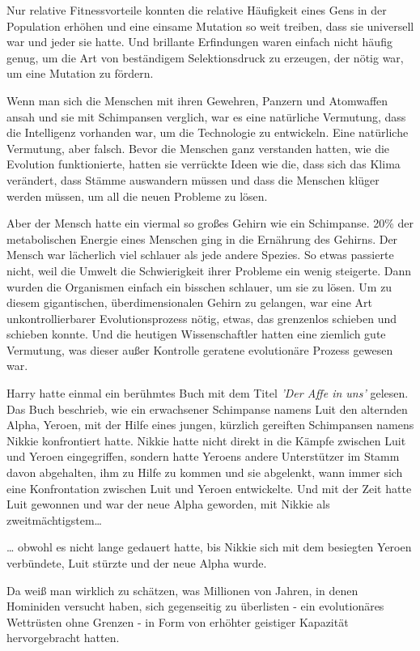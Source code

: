 {Nur relative Fitnessvorteile konnten die relative Häufigkeit eines Gens in der Population erhöhen und eine einsame Mutation so weit treiben, dass sie universell war und jeder sie hatte. Und brillante Erfindungen waren einfach nicht häufig genug, um die Art von beständigem Selektionsdruck zu erzeugen, der nötig war, um eine Mutation zu fördern.

Wenn man sich die Menschen mit ihren Gewehren, Panzern und Atomwaffen ansah und sie mit Schimpansen verglich, war es eine natürliche Vermutung, dass die Intelligenz vorhanden war, um die Technologie zu entwickeln. Eine natürliche Vermutung, aber falsch. Bevor die Menschen ganz verstanden hatten, wie die Evolution funktionierte, hatten sie verrückte Ideen wie die, dass sich das Klima verändert, dass Stämme auswandern müssen und dass die Menschen klüger werden müssen, um all die neuen Probleme zu lösen.

Aber der Mensch hatte ein viermal so großes Gehirn wie ein Schimpanse. 20\% der metabolischen Energie eines Menschen ging in die Ernährung des Gehirns. Der Mensch war lächerlich viel schlauer als jede andere Spezies. So etwas passierte nicht, weil die Umwelt die Schwierigkeit ihrer Probleme ein wenig steigerte. Dann wurden die Organismen einfach ein bisschen schlauer, um sie zu lösen. Um zu diesem gigantischen, überdimensionalen Gehirn zu gelangen, war eine Art unkontrollierbarer Evolutionsprozess nötig, etwas, das grenzenlos schieben und schieben konnte. Und die heutigen Wissenschaftler hatten eine ziemlich gute Vermutung, was dieser außer Kontrolle geratene evolutionäre Prozess gewesen war.

Harry hatte einmal ein berühmtes Buch mit dem Titel \emph{'Der Affe in uns'} gelesen. Das Buch beschrieb, wie ein erwachsener Schimpanse namens Luit den alternden Alpha, Yeroen, mit der Hilfe eines jungen, kürzlich gereiften Schimpansen namens Nikkie konfrontiert hatte. Nikkie hatte nicht direkt in die Kämpfe zwischen Luit und Yeroen eingegriffen, sondern hatte Yeroens andere Unterstützer im Stamm davon abgehalten, ihm zu Hilfe zu kommen und sie abgelenkt, wann immer sich eine Konfrontation zwischen Luit und Yeroen entwickelte. Und mit der Zeit hatte Luit gewonnen und war der neue Alpha geworden, mit Nikkie als zweitmächtigstem…

… obwohl es nicht lange gedauert hatte, bis Nikkie sich mit dem besiegten Yeroen verbündete, Luit stürzte und der neue Alpha wurde.

Da weiß man wirklich zu schätzen, was Millionen von Jahren, in denen Hominiden versucht haben, sich gegenseitig zu überlisten - ein evolutionäres Wettrüsten ohne Grenzen - in Form von erhöhter geistiger Kapazität hervorgebracht hatten.

}

